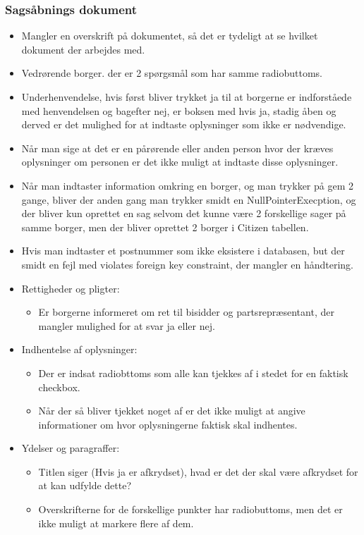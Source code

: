 \subsubsection{Sagsåbnings dokument}
\begin{itemize}
\item Mangler en overskrift på dokumentet, så det er tydeligt at se hvilket dokument der arbejdes med.
\item Vedrørende borger. der er 2 spørgsmål som har samme radiobuttoms.
\item Underhenvendelse, hvis først bliver trykket ja til at borgerne er indforståede med henvendelsen og bagefter nej, er boksen med hvis ja, stadig åben og derved er det mulighed for at indtaste oplysninger som ikke er nødvendige.
\item Når man sige at det er en pårørende eller anden person hvor der kræves oplysninger om personen er det ikke muligt at indtaste disse oplysninger.
\item Når man indtaster information omkring en borger, og man trykker på gem 2 gange, bliver der anden gang man trykker smidt en NullPointerExecption, og der bliver kun oprettet en sag selvom det kunne være 2 forskellige sager på samme borger, men der bliver oprettet 2 borger i Citizen tabellen.
\item Hvis man indtaster et postnummer som ikke eksistere i databasen, but der smidt en fejl med violates foreign key constraint, der mangler en håndtering.
\item Rettigheder og pligter:
\begin{itemize}
\item Er borgerne informeret om ret til bisidder og partsrepræsentant, der mangler mulighed for at svar ja eller nej.
\end{itemize}
\item Indhentelse af oplysninger:
\begin{itemize}
\item Der er indsat radiobttoms som alle kan tjekkes af i stedet for en faktisk checkbox.
\item Når der så bliver tjekket noget af er det ikke muligt at angive informationer om hvor oplysningerne faktisk skal indhentes.
\end{itemize}
\item Ydelser og paragraffer:
\begin{itemize}
\item Titlen siger (Hvis ja er afkrydset), hvad er det der skal være afkrydset for at kan udfylde dette?
\item Overskrifterne for de forskellige punkter har radiobuttoms, men det er ikke muligt at markere flere af dem.

\end{itemize}
\end{itemize}
